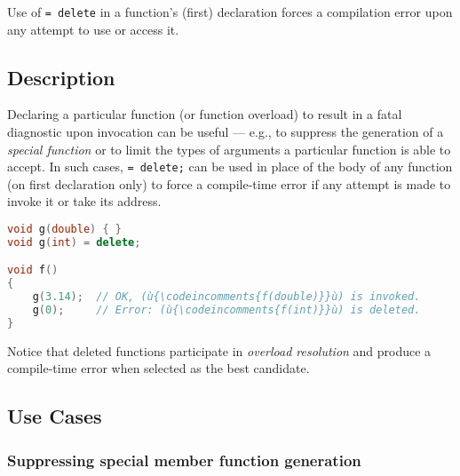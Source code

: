 

Use of \texttt{=}~\texttt{delete} in a function's (first) declaration
forces a compilation error upon any attempt to use or access it.

\subsection[Description]{Description}\label{description}

Declaring a particular function (or function overload) to result in a
fatal diagnostic upon invocation can be useful --- e.g., to suppress the
generation of a \emph{special function} or to limit the types of
arguments a particular function is able to accept. In such cases,
\texttt{=}~\texttt{delete;} can be used in place of the body of any
function (on first declaration only) to force a compile-time error if
any attempt is made to invoke it or take its address.

\begin{lstlisting}[language=C++]
void g(double) { }
void g(int) = delete;

void f()
{
    g(3.14);  // OK, (ù{\codeincomments{f(double)}}ù) is invoked.
    g(0);     // Error: (ù{\codeincomments{f(int)}}ù) is deleted.
}
\end{lstlisting}
    
\noindent Notice that deleted functions participate in \emph{overload resolution}
and produce a compile-time error when selected as the best candidate.

\subsection[Use Cases]{Use Cases}\label{use-cases}

\subsubsection[Suppressing special member function generation]{Suppressing special member function generation}\label{suppressing-special-member-function-generation}

